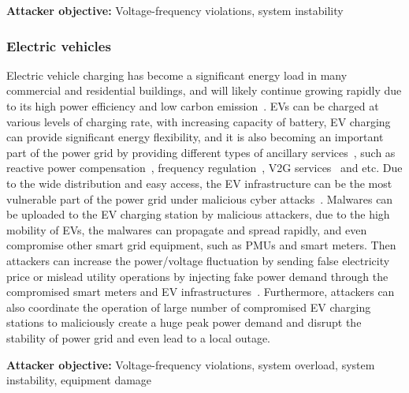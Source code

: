 \documentclass[conference]{IEEEtran}
\begin{document}
\textbf{Attacker objective:} Voltage-frequency violations, system instability 
\subsubsection{Electric vehicles}
Electric vehicle charging has become a significant energy load in many commercial and residential buildings, and will likely continue growing rapidly due to its high power efficiency and low carbon emission~\cite{Wei:ICCAD2014}. EVs can be charged at various levels of charging rate, with increasing capacity of battery, EV charging can provide significant energy flexibility, and it is also becoming an important part of the power grid by providing different types of ancillary services~\cite{Knezovic:TE2017}, such as reactive power compensation~\cite{Buja:PE2017}, frequency regulation~\cite{Guo:ICC2016}, V2G services~\cite{Mohamed:PEC2016} and etc. Due to the wide distribution and easy access, the EV infrastructure can be the most vulnerable part of the power grid under malicious cyber attacks~\cite{Mousavian:GW2015,Ghansah:PIER2009}. Malwares can be uploaded to the EV charging station by malicious attackers, due to the high mobility of EVs, the malwares can propagate and spread rapidly, and even compromise other smart grid equipment, such as PMUs and smart meters. Then attackers can increase the power/voltage fluctuation by sending false electricity price or mislead utility operations by injecting fake power demand through the compromised smart meters and EV infrastructures~\cite{Ahmed:2016}. Furthermore, attackers can also coordinate the operation of large number of compromised EV charging stations to maliciously create a huge peak power demand and disrupt the stability of power grid and even lead to a local outage.

\textbf{Attacker objective:} Voltage-frequency violations, system overload, system instability, equipment damage 
\end{document}
